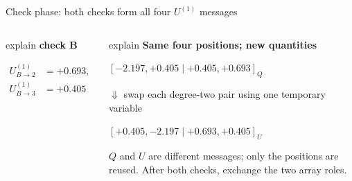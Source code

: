 \documentclass[aspectratio=169,9pt,t]{beamer}
\newcommand{\callout}[1]{%
  \begin{beamercolorbox}[rounded=true,sep=.65ex]{explain}
    \scriptsize #1
  \end{beamercolorbox}}
\begin{document}
\begin{frame}{Check phase: both checks form all four \texorpdfstring{$U^{(1)}$}{U(1)} messages}
\begin{columns}[T,onlytextwidth]
\begin{columns}[T,onlytextwidth]
          \callout{\centering\textbf{check B}\par
            $\begin{aligned}
              U^{(1)}_{B\to2}&=+0.693,\\
              U^{(1)}_{B\to3}&=+0.405
            \end{aligned}$}
      \end{columns}
      \vspace{.3mm}
      \callout{\centering
        \textbf{Same four positions; new quantities}\par\vspace{.4mm}
        $[-2.197,+0.405\mid+0.405,+0.693]_{Q}$\par
        $\Downarrow$ swap each degree-two pair using one temporary variable\par
        $[+0.405,-2.197\mid+0.693,+0.405]_{U}$\par
        $Q$ and $U$ are different messages; only the positions are reused. After both checks, exchange the two array roles.}
  \end{columns}

\end{frame}
\end{document}
